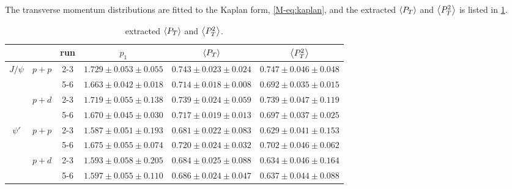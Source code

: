 \documentclass[../main.tex]{subfiles}
\begin{document}
The transverse momentum distributions are fitted to the Kaplan form, \cref{M-eq:kaplan}, and the extracted 
$\expval{P_T}$ and $\expval{P^2_T}$ is listed in \cref{tab:kaplan_result}.
\begin{table}[h!]
\centering
\caption{extracted $\expval{P_T}$ and $\expval{P^2_T}$.}
\label{tab:kaplan_result}
\begin{tabular}{cc|c|c|c|c}
\hline
                                               &                        & run & $p_1$                   & $\expval{P_T}$          & $\expval{P^2_T}$        \\ \hline
\multicolumn{1}{c|}{\multirow{4}{*}{$J/\psi$}} & \multirow{2}{*}{$p+p$} & 2-3 & $1.729\pm0.053\pm0.055$ & $0.743\pm0.023\pm0.024$ & $0.747\pm0.046\pm0.048$ \\ \cline{3-6} 
\multicolumn{1}{c|}{}                          &                        & 5-6 & $1.663\pm0.042\pm0.018$ & $0.714\pm0.018\pm0.008$ & $0.692\pm0.035\pm0.015$ \\ \cline{2-6} 
\multicolumn{1}{c|}{}                          & \multirow{2}{*}{$p+d$} & 2-3 & $1.719\pm0.055\pm0.138$ & $0.739\pm0.024\pm0.059$ & $0.739\pm0.047\pm0.119$ \\ \cline{3-6} 
\multicolumn{1}{c|}{}                          &                        & 5-6 & $1.670\pm0.045\pm0.030$ & $0.717\pm0.019\pm0.013$ & $0.697\pm0.037\pm0.025$ \\ \hline
\multicolumn{1}{c|}{\multirow{4}{*}{$\psi'$}}  & \multirow{2}{*}{$p+p$} & 2-3 & $1.587\pm0.051\pm0.193$ & $0.681\pm0.022\pm0.083$ & $0.629\pm0.041\pm0.153$ \\ \cline{3-6} 
\multicolumn{1}{c|}{}                          &                        & 5-6 & $1.675\pm0.055\pm0.074$ & $0.720\pm0.024\pm0.032$ & $0.702\pm0.046\pm0.062$ \\ \cline{2-6} 
\multicolumn{1}{c|}{}                          & \multirow{2}{*}{$p+d$} & 2-3 & $1.593\pm0.058\pm0.205$ & $0.684\pm0.025\pm0.088$ & $0.634\pm0.046\pm0.164$ \\ \cline{3-6} 
\multicolumn{1}{c|}{}                          &                        & 5-6 & $1.597\pm0.055\pm0.110$ & $0.686\pm0.024\pm0.047$ & $0.637\pm0.044\pm0.088$ \\ \hline
\end{tabular}
\end{table}
\end{document}
